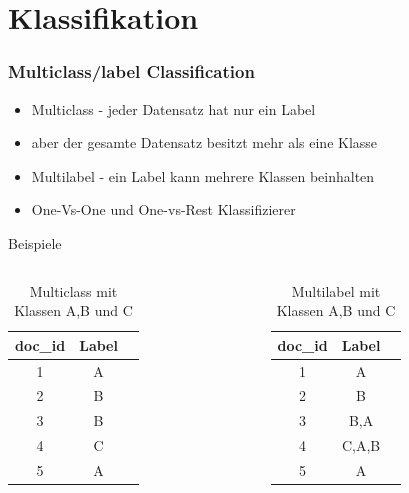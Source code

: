 \documentclass[12pt, xcolor=table]{beamer}
\begin{document}
\section{Klassifikation} %
\label{sec:Klassifikation}

\begin{frame}
    \frametitle{Multiclass/label Classification}
    \begin{itemize}
    \item Multiclass - jeder Datensatz hat nur ein Label
        \item aber der gesamte Datensatz besitzt mehr als eine Klasse
        \item Multilabel - ein Label kann mehrere Klassen beinhalten
        \item One-Vs-One und One-vs-Rest Klassifizierer
    \end{itemize}
    \begin{block}{Beispiele}
    \begin{columns}
    \begin{table}
        \begin{tabular}{ccc}
            \tiny\textbf{doc\_id} &\tiny \textbf{Label}  \\
            \hline
            \tiny 1 &\tiny A  \\
            \tiny 2 &\tiny B  \\
            \tiny 3 &\tiny B  \\
            \tiny 4 &\tiny C  \\
            \tiny 5 &\tiny A  \\
        \end{tabular}
         \caption*{Multiclass mit Klassen A,B und C}
    \end{table}
    \begin{table}
        \begin{tabular}{ccc}
            \tiny\textbf{doc\_id} &\tiny \textbf{Label}  \\
            \hline
            \tiny 1 &\tiny A  \\
            \tiny 2 &\tiny B  \\
            \tiny 3 &\tiny B,A  \\
            \tiny 4 &\tiny C,A,B  \\
            \tiny 5 &\tiny A  \\
        \end{tabular}
         \caption*{Multilabel mit Klassen A,B und C}
    \end{table}
    \end{columns}
    \end{block}
\end{frame}
\end{document}
